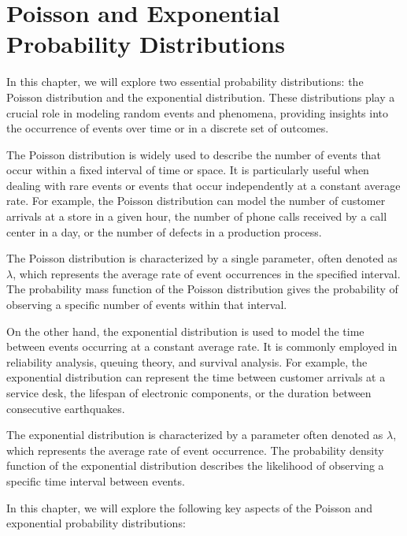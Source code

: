 \chapter{Poisson and Exponential Probability Distributions}

In this chapter, we will explore two essential probability distributions: the Poisson distribution and the exponential distribution. These distributions play a crucial role in modeling random events and phenomena, providing insights into the occurrence of events over time or in a discrete set of outcomes.

The Poisson distribution is widely used to describe the number of events that occur within a fixed interval of time or space. It is particularly useful when dealing with rare events or events that occur independently at a constant average rate. For example, the Poisson distribution can model the number of customer arrivals at a store in a given hour, the number of phone calls received by a call center in a day, or the number of defects in a production process.

The Poisson distribution is characterized by a single parameter, often denoted as $\lambda$, which represents the average rate of event occurrences in the specified interval. The probability mass function of the Poisson distribution gives the probability of observing a specific number of events within that interval.

On the other hand, the exponential distribution is used to model the time between events occurring at a constant average rate. It is commonly employed in reliability analysis, queuing theory, and survival analysis. For example, the exponential distribution can represent the time between customer arrivals at a service desk, the lifespan of electronic components, or the duration between consecutive earthquakes.

The exponential distribution is characterized by a parameter often denoted as $\lambda$, which represents the average rate of event occurrence. The probability density function of the exponential distribution describes the likelihood of observing a specific time interval between events.

In this chapter, we will explore the following key aspects of the Poisson and exponential probability distributions:

